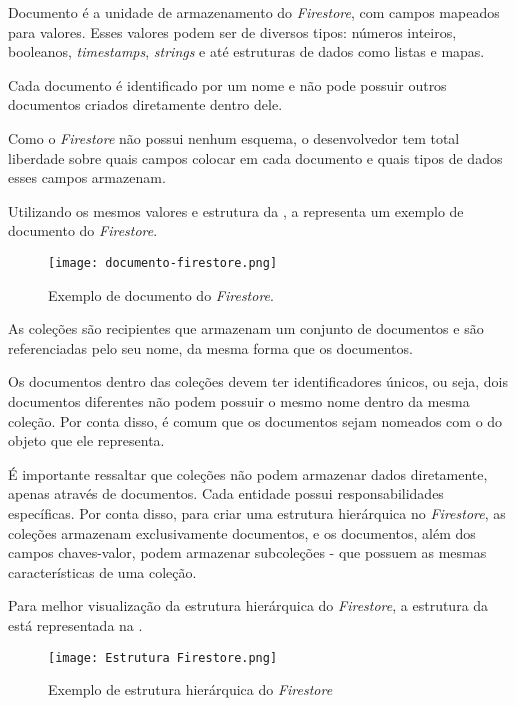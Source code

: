 Documento é a unidade de armazenamento do \textit{Firestore}, com campos mapeados para valores. Esses valores podem ser de diversos tipos: números inteiros, booleanos, \textit{timestamps}, \textit{strings} e até estruturas de dados como listas e mapas.

Cada documento é identificado por um nome e não pode possuir outros documentos criados diretamente dentro dele.

Como o \textit{Firestore} não possui nenhum esquema, o desenvolvedor tem total liberdade sobre quais campos colocar em cada documento e quais tipos de dados esses campos armazenam.

Utilizando os mesmos valores e estrutura da , a  representa um exemplo de documento do \textit{Firestore}.

\begin{figure}[!htb]
    \centering
    \texttt{[image: documento-firestore.png]}
    \caption{Exemplo de documento do \textit{Firestore}.}
    \label{fig:explicacaodocumentofirestore}
\end{figure}

As coleções são recipientes que armazenam um conjunto de documentos e são referenciadas pelo seu nome, da mesma forma que os documentos.

Os documentos dentro das coleções devem ter identificadores únicos, ou seja, dois documentos diferentes não podem possuir o mesmo nome dentro da mesma coleção. Por conta disso, é comum que os documentos sejam nomeados com o  do objeto que ele representa.

É importante ressaltar que coleções não podem armazenar dados diretamente, apenas através de documentos. Cada entidade possui responsabilidades específicas. Por conta disso, para criar uma estrutura hierárquica no \textit{Firestore}, as coleções armazenam exclusivamente documentos, e os documentos, além dos campos chaves-valor, podem armazenar subcoleções - que possuem as mesmas características de uma coleção.

Para melhor visualização da estrutura hierárquica do \textit{Firestore}, a estrutura da  está representada na .

\begin{figure}[!htb]
    \centering
    \texttt{[image: Estrutura Firestore.png]}
    \caption{Exemplo de estrutura hierárquica do \textit{Firestore}}
    \label{fig:explicacaofirestorecompleto}
\end{figure}

